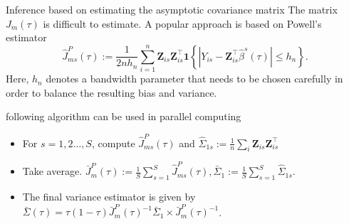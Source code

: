 \documentclass[11pt]{beamer}
\begin{document}
\begin{frame}{Inference based on estimating the asymptotic covariance matrix}
The matrix $J_m(\tau)$ is difficult to estimate. A popular approach is based on Powell’s estimator
$$
\widehat{J}_{m s}^{P}(\tau):=\frac{1}{2 n h_{n}} \sum_{i=1}^{n} \mathbf{Z}_{i s} \mathbf{Z}_{i s}^{\top} \mathbf{1}\left\{\left|Y_{i s}-\mathbf{Z}_{i s}^{\top} \widehat{\beta}^{s}(\tau)\right| \leq h_{n}\right\}.
$$
Here, $h_n$ denotes a bandwidth parameter that needs to be chosen carefully in order
to balance the resulting bias and variance.

following algorithm can be used in parallel computing
\begin{itemize}
\item For $s=1,2\dots,S$, compute $\widehat{J}_{m s}^{P}(\tau)$ and $\widehat{\Sigma}_{1 s}:=\frac{1}{n} \sum_{i} \mathbf{Z}_{i s} \mathbf{Z}_{i s}^{\top}$
\item Take average. $\bar{J}_{m}^{P}(\tau):=\frac{1}{S} \sum_{s=1}^{S} \widehat{J}_{m s}^{P}(\tau), \bar{\Sigma}_{1}:=\frac{1}{S} \sum_{s=1}^{S} \widehat{\Sigma}_{1 s}$.
\item The final variance estimator is given by
$\bar{\Sigma}(\tau)=\tau(1-\tau) \bar{J}_{m}^{P}(\tau)^{-1} \bar{\Sigma}_{1} \times \bar{J}_{m}^{P}(\tau)^{-1}$.
\end{itemize}
\end{frame}
\end{document}
